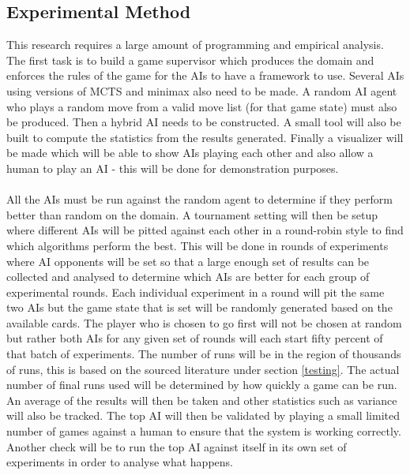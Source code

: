 \documentclass [11pt]{article}
\begin{document}
	\subsection{Experimental Method}
	This research requires a large amount of programming and empirical analysis. The first task is to build a game supervisor which produces the domain and enforces the rules of the game for the AIs to have a framework to use. Several AIs using versions of MCTS and minimax also need to be made. A random AI agent who plays a random move from a valid move list (for that game state) must also be produced. Then a hybrid AI needs to be constructed. A small tool will also be built to compute the statistics from the results generated. Finally a visualizer will be made which will be able to show AIs playing each other and also allow a human to play an AI - this will be done for demonstration purposes.\\\\
	All the AIs must be run against the random agent to determine if they perform better than random on the domain. A tournament setting will then be setup where different AIs will be pitted against each other in a round-robin style to find which algorithms perform the best. This will be done in rounds of experiments where AI opponents will be set so that a large enough set of results can be collected and analysed to determine which AIs are better for each group of experimental rounds. Each individual experiment in a round will pit the same two AIs but the game state that is set will be randomly generated based on the available cards. The player who is chosen to go first will not be chosen at random but rather both AIs for any given set of rounds will each start fifty percent of that batch of experiments. The number of runs will be in the region of thousands of runs, this is based on the sourced literature under section \ref{testing}. The actual number of final runs used will be determined by how quickly a game can be run. An average of the results will then be taken and other statistics such as variance will also be tracked. The top AI will then be validated by playing a small limited number of games against a human to ensure that the system is working correctly. Another check will be to run the top AI against itself in its own set of experiments in order to analyse what happens. 
	
\end{document}

